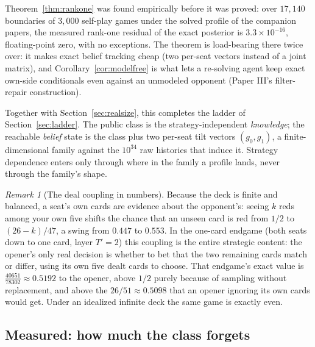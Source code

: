 \documentclass[11pt]{article}
\theoremstyle{plain}
\theoremstyle{definition}
\theoremstyle{remark}
\newtheorem{remark}[theorem]{Remark}
\begin{document}
Theorem~\ref{thm:rankone} was found empirically before it was proved: over
$17{,}140$ boundaries of $3{,}000$ self-play games under the solved
profile of the companion papers, the measured rank-one residual of the
exact posterior is $3.3\times10^{-16}$, floating-point zero, with no
exceptions. The theorem is load-bearing there twice over: it makes exact
belief tracking cheap (two per-seat vectors instead of a joint matrix),
and Corollary~\ref{cor:modelfree} is what lets a re-solving agent keep
exact own-side conditionals even against an unmodeled opponent (Paper
III's filter-repair construction).

Together with Section~\ref{sec:realsize}, this completes the ladder of
Section~\ref{sec:ladder}. The public class is the strategy-independent
\emph{knowledge}; the reachable \emph{belief} state is the class plus two
per-seat tilt vectors $(g_0,g_1)$, a finite-dimensional family against the
$10^{34}$ raw histories that induce it. Strategy dependence enters only
through where in the family a profile lands, never through the family's
shape.

\begin{remark}[The deal coupling in numbers]\label{rem:deckvalue}
Because the deck is finite and balanced, a seat's own cards are evidence
about the opponent's: seeing $k$ reds among your own five shifts the
chance that an unseen card is red from $1/2$ to $(26-k)/47$, a swing from
$0.447$ to $0.553$. In the one-card endgame (both seats down to one card,
layer $T'=2$) this coupling is the entire strategic content: the opener's
only real decision is whether to bet that the two remaining cards match or
differ, using its own five dealt cards to choose. That endgame's exact
value is $\tfrac{40651}{78302}\approx 0.5192$ to the opener, above $1/2$
purely because of sampling without replacement, and above the
$26/51\approx0.5098$ that an opener ignoring its own cards would get.
Under an idealized infinite deck the same game is exactly even.
\end{remark}

\subsection{Measured: how much the class forgets}\label{sec:forgetsmeasured}
\end{document}
